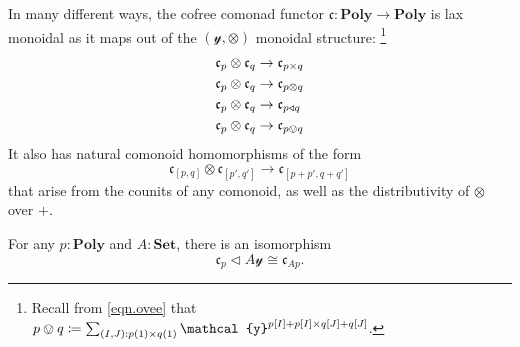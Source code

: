 \documentclass[11pt, one side, article]{memoir}
\theoremstyle{definition}
\theoremstyle{plain}
\newcommand{\Cat}[1]{\mathbf{#1}}%
\newcommand{\Fun}[1]{\mathsf{#1}}%
\newcommand{\smset}{\Cat{Set}}
\newcommand{\List}{\Fun{list}}
\newcommand{\yon}{{\mathcal{y}}}
\newcommand{\poly}{\Cat{Poly}}
\newcommand{\0}{\textsf{0}}
\newcommand{\1}{\tn{\textsf{1}}}
\newcommand{\tri}{\mathbin{\triangleleft}}
\newcommand{\cofree}{\mathfrak{c}}
\newcommand{\uu}{\List}
\begin{document}
In many different ways, the cofree comonad functor $\cofree\colon\poly\to\poly$ is lax monoidal as it maps out of the $(\yon,\otimes)$ monoidal structure:%
\footnote{Recall from \eqref{eqn.ovee} that $p\ovee q\coloneqq \sum_{(I,J): p(1)\times q(1)}\yon^{p[I]+p[I]\times q[J]+q[J]}$.}
\begin{align}
  \cofree_p\otimes\cofree_q&\to\cofree_{p\times q}\\
  \label{cofree_lax_monoidal}
  \cofree_p\otimes\cofree_q&\to\cofree_{p\otimes q}\\
  \cofree_p\otimes\cofree_q&\to\cofree_{p\tri q}\\
	\cofree_p\otimes\cofree_q&\to\cofree_{p\ovee q}  
\end{align}
It also has natural comonoid homomorphisms of the form
\begin{equation}
	\cofree_{[p,q]}\otimes\cofree_{[p',q']}\to\cofree_{[p+p',q+q']}
\end{equation}
that arise from the counits of any comonoid, as well as the distributivity of $\otimes$ over $+$.


For any $p:\poly$ and $A:\smset$, there is an isomorphism
\begin{equation}
	\cofree_p\tri A\yon\cong\cofree_{Ap}.
\end{equation}
\end{document}
